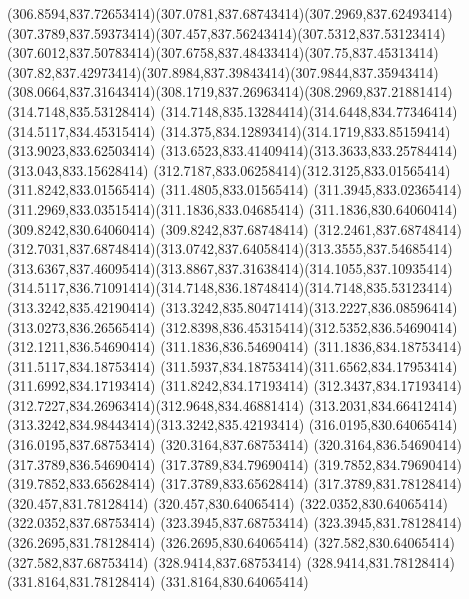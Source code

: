 {{	\curveto(306.8594,837.72653414)(307.0781,837.68743414)(307.2969,837.62493414)
	\curveto(307.3789,837.59373414)(307.457,837.56243414)(307.5312,837.53123414)
	\curveto(307.6012,837.50783414)(307.6758,837.48433414)(307.75,837.45313414)
	\curveto(307.82,837.42973414)(307.8984,837.39843414)(307.9844,837.35943414)
	\curveto(308.0664,837.31643414)(308.1719,837.26963414)(308.2969,837.21881414)
	\closepath
	\moveto(314.7148,835.53128414)
	\curveto(314.7148,835.13284414)(314.6448,834.77346414)(314.5117,834.45315414)
	\curveto(314.375,834.12893414)(314.1719,833.85159414)(313.9023,833.62503414)
	\curveto(313.6523,833.41409414)(313.3633,833.25784414)(313.043,833.15628414)
	\curveto(312.7187,833.06258414)(312.3125,833.01565414)(311.8242,833.01565414)
	\lineto(311.4805,833.01565414)
	\curveto(311.3945,833.02365414)(311.2969,833.03515414)(311.1836,833.04685414)
	\lineto(311.1836,830.64060414)
	\lineto(309.8242,830.64060414)
	\lineto(309.8242,837.68748414)
	\lineto(312.2461,837.68748414)
	\curveto(312.7031,837.68748414)(313.0742,837.64058414)(313.3555,837.54685414)
	\curveto(313.6367,837.46095414)(313.8867,837.31638414)(314.1055,837.10935414)
	\curveto(314.5117,836.71091414)(314.7148,836.18748414)(314.7148,835.53123414)
	\closepath
	\moveto(313.3242,835.42190414)
	\curveto(313.3242,835.80471414)(313.2227,836.08596414)(313.0273,836.26565414)
	\curveto(312.8398,836.45315414)(312.5352,836.54690414)(312.1211,836.54690414)
	\lineto(311.1836,836.54690414)
	\lineto(311.1836,834.18753414)
	\lineto(311.5117,834.18753414)
	\curveto(311.5937,834.18753414)(311.6562,834.17953414)(311.6992,834.17193414)
	\lineto(311.8242,834.17193414)
	\curveto(312.3437,834.17193414)(312.7227,834.26963414)(312.9648,834.46881414)
	\curveto(313.2031,834.66412414)(313.3242,834.98443414)(313.3242,835.42193414)
	\closepath
	\moveto(316.0195,830.64065414)
	\lineto(316.0195,837.68753414)
	\lineto(320.3164,837.68753414)
	\lineto(320.3164,836.54690414)
	\lineto(317.3789,836.54690414)
	\lineto(317.3789,834.79690414)
	\lineto(319.7852,834.79690414)
	\lineto(319.7852,833.65628414)
	\lineto(317.3789,833.65628414)
	\lineto(317.3789,831.78128414)
	\lineto(320.457,831.78128414)
	\lineto(320.457,830.64065414)
	\closepath
	\moveto(322.0352,830.64065414)
	\lineto(322.0352,837.68753414)
	\lineto(323.3945,837.68753414)
	\lineto(323.3945,831.78128414)
	\lineto(326.2695,831.78128414)
	\lineto(326.2695,830.64065414)
	\closepath
	\moveto(327.582,830.64065414)
	\lineto(327.582,837.68753414)
	\lineto(328.9414,837.68753414)
	\lineto(328.9414,831.78128414)
	\lineto(331.8164,831.78128414)
	\lineto(331.8164,830.64065414)
	\closepath
}}
